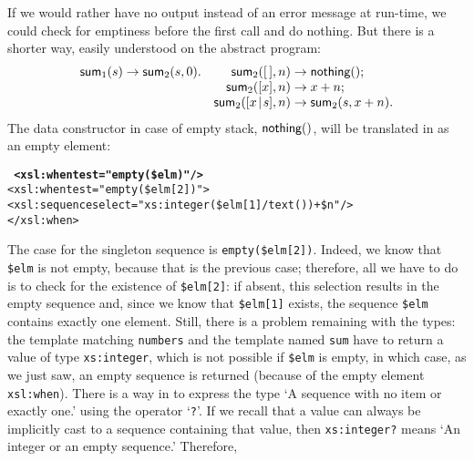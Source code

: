 If we would rather have no output instead of an error message at
run\hyp{}time, we could check for emptiness before the first call and
do nothing. But there is a shorter way, easily understood on the
abstract program:
\begin{equation*}
\begin{array}{@{}r@{\;}l@{\;}lr@{\;}l@{\;}l@{}}
\fun{sum}_1(s) & \rightarrow & \fun{sum}_2(s,0). &
    \fun{sum}_2(\el,n) & \rightarrow & \fun{nothing}();\\
&&& \fun{sum}_2([x],n) & \rightarrow & x+n;\\
&&& \fun{sum}_2(\cons{x}{s},n) & \rightarrow & \fun{sum}_2(s,x+n).
\end{array}
\end{equation*}
The data constructor in case of empty stack, \(\textsf{nothing}()\), will
be translated in \XSLT as an empty element:
\begin{alltt}
\      \textbf{<xsl:when test="empty(\$elm)"/>}
      <xsl:when test="empty(\$elm[2])">
        <xsl:sequence select="xs:integer(\$elm[1]/text()) + \$n"/>
      </xsl:when>
\end{alltt}
The case for the singleton sequence is
\texttt{empty(\$elm[2])}. Indeed, we know that \texttt{\$elm} is not
empty, because that is the previous case; therefore, all we have to do
is to check for the existence of \texttt{\$elm[2]}: if absent, this
selection results in the empty sequence and, since we know that
\texttt{\$elm[1]} exists, the sequence \texttt{\$elm} contains exactly
one element. Still, there is a problem remaining with the types: the
template matching \texttt{numbers} and the template named \texttt{sum}
have to return a value of type \texttt{xs:integer}, which is not
possible if \texttt{\$elm} is empty, in which case, as we just saw, an
empty sequence is returned (because of the empty element
\texttt{xsl:when}). There is a way in \XPath to express the type `A
sequence with no item or exactly one.' using the operator
`\texttt{?}'. If we recall that a value can always be implicitly cast
to a sequence containing that value, then \texttt{xs:integer?} means
`An integer or an empty sequence.' Therefore,


